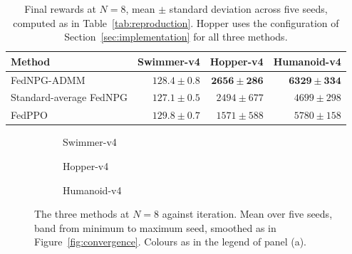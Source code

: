 \begin{table}[t]
  \centering
  \caption{Final rewards at $N=8$, mean $\pm$ standard deviation across five
  seeds, computed as in Table~\ref{tab:reproduction}. Hopper uses the
  configuration of Section~\ref{sec:implementation} for all three methods.}
  \label{tab:baselines}
  \begin{tabular}{lrrr}
    \toprule
    Method & Swimmer-v4 & Hopper-v4 & Humanoid-v4 \\
    \midrule
    FedNPG-ADMM             & $128.4 \pm 0.8$ & $\mathbf{2656 \pm 286}$ & $\mathbf{6329 \pm 334}$ \\
    Standard-average FedNPG & $127.1 \pm 0.5$ & $2494 \pm 677$ & $4699 \pm 298$ \\
    FedPPO                  & $\mathbf{129.8 \pm 0.7}$ & $1571 \pm 588$ & $5780 \pm 158$ \\
    \bottomrule
  \end{tabular}
\end{table}

\begin{figure}[t]
  \centering
  \begin{subfigure}[b]{0.49\textwidth}
    
    \caption{Swimmer-v4}
  \end{subfigure}
  \hfill
  \begin{subfigure}[b]{0.49\textwidth}
    
    \caption{Hopper-v4}
  \end{subfigure}

  \vspace{0.6em}
  \begin{subfigure}[b]{0.49\textwidth}
    
    \caption{Humanoid-v4}
  \end{subfigure}
  \caption{The three methods at $N=8$ against iteration. Mean over five seeds,
  band from minimum to maximum seed, smoothed as in
  Figure~\ref{fig:convergence}. Colours as in the legend of panel (a).}
  \label{fig:baselines-iter}
\end{figure}

